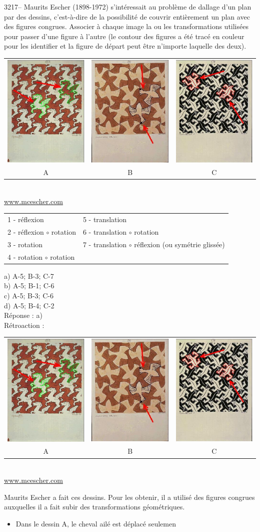 \documentclass[letterpaper, 12pt]{article}
\begin{document}
3217-- Maurits Escher (1898-1972) s'int\'eressait au probl\`eme de dallage d'un plan par des dessins, c'est-\`a-dire de la possibilit\'e de couvrir enti\`erement un plan avec des figures congrues. Associer \`a chaque image la ou les transformations utilis\'ees pour passer d'une figure \`a l'autre (le contour des figures a \'et\'e trac\'e en couleur pour les identifier et la figure de d\'epart peut \^etre n'importe laquelle des deux).
\begin{center}
\begin{tabular}{c c c}
\includegraphics[scale=0.82]{cheval.eps} & \includegraphics[scale=0.82]{oiseau.eps} & \includegraphics[scale=0.82]{lezard.eps}\\
A & B & C\\[2mm]
\end{tabular}\\
\href{http://www.mcescher.com/}{www.mcescher.com}\\[5mm]
\begin{tabular}{p{6cm} p{9cm}}
1 - r\'eflexion & 5 - translation\\
2 - r\'eflexion $\circ$ rotation & 6 - translation $\circ$ rotation\\
3 - rotation & 7 - translation $\circ$ r\'eflexion (ou sym\'etrie gliss\'ee)\\
4 - rotation $\circ$ rotation\\
\end{tabular}
\end{center}

a) A-5; B-3; C-7\\
b) A-5; B-1; C-6\\
c) A-5; B-3; C-6\\
d) A-5; B-4; C-2\\

R\'eponse : a)\\

R\'etroaction :\\
\begin{center}
\begin{tabular}{c c c}
\includegraphics[scale=0.82]{cheval.eps} & \includegraphics[scale=0.82]{oiseau.eps} & \includegraphics[scale=0.82]{lezard.eps}\\
A & B & C\\
\end{tabular}\\[2mm]
\href{http://www.mcescher.com/}{www.mcescher.com}\\[5mm]
\end{center}
Maurits Escher a fait ces dessins. Pour les obtenir, il a utilis\'e des figures congrues auxquelles il a fait subir des transformations g\'eom\'etriques.\\
\begin{itemize}
\item Dans le dessin A, le cheval ail\'e est d\'eplac\'e seulemen
\end{itemize}
\end{document}
